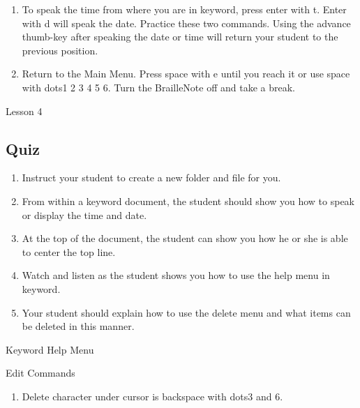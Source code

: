 \documentclass[10pt,letterpaper,twoside]{report}
\begin{document}
{{{{\begin{enumerate}
	\item To speak the time from where you are in keyword, press enter with t. Enter with d will speak the date.  Practice these two commands.  Using the advance thumb-key after speaking the date or time will return your student to the previous position.
	      
	\item Return to the Main Menu.  Press space with e until you reach it or use space with dots1 2 3 4 5 6.  Turn the BrailleNote off and take a break.
\end{enumerate}





\clearpage

\newpage
Lesson 4

\subsection{Quiz}



\begin{enumerate}
	\item Instruct your student to create a new folder and file for you.
	      
	\item From within a keyword document, the student should show you how to speak or display the time and date.
	      
	\item At the top of the document, the student can show you how he or she is able to center the top line.
	      
	\item Watch and listen as the student shows you how to use the help menu in keyword.
	      
	\item Your student should explain how to use the delete menu and what items can be deleted in this manner.
\end{enumerate}





\clearpage

\newpage
Keyword Help Menu



Edit Commands



\begin{enumerate}
	\item Delete character under cursor is backspace with dots3 and 6.
	      

\end{enumerate}}}}}
\end{document}
